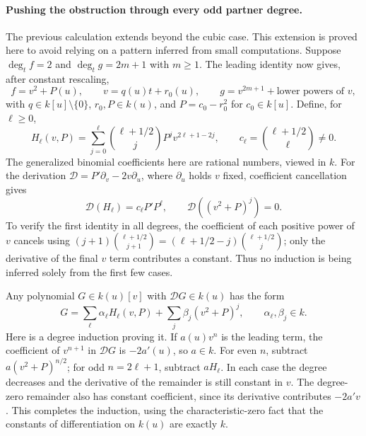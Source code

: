 \documentclass[11pt]{article}
\begin{document}
\paragraph{Pushing the obstruction through every odd partner degree.}
The previous calculation extends beyond the cubic case. This extension is
proved here to avoid relying on a pattern inferred from small computations.
Suppose $\deg_t f=2$ and $\deg_t g=2m+1$ with $m\ge1$. The leading identity
now gives, after constant rescaling,
\[
 f=v^2+P(u),\qquad v=q(u)t+r_0(u),\qquad
 g=v^{2m+1}+\text{lower powers of }v,
\]
with $q\in k[u]\setminus\{0\}$, $r_0,P\in k(u)$, and
$P=c_0-r_0^2$ for $c_0\in k[u]$. Define, for $\ell\ge0$,
\begin{equation}\label{statement:oddforms}
 H_\ell(v,P)=\sum_{j=0}^{\ell}
   \binom{\ell+1/2}{j}P^jv^{2\ell+1-2j},
 \qquad
 c_\ell=\binom{\ell+1/2}{\ell}\ne0.
\end{equation}
The generalized binomial coefficients here are rational numbers, viewed in
$k$. For the derivation
$\mathcal D=P'\partial_v-2v\partial_u$, where $\partial_u$ holds $v$ fixed,
coefficient cancellation gives
\begin{equation}\label{statement:derivation}
 \mathcal D(H_\ell)=c_\ell P'P^\ell,
 \qquad \mathcal D((v^2+P)^j)=0.
\end{equation}
To verify the first identity in all degrees, the coefficient of each positive
power of $v$ cancels using
$(j+1)\binom{\ell+1/2}{j+1}
 =(\ell+1/2-j)\binom{\ell+1/2}{j}$; only the derivative of the final
$v$ term contributes a constant. Thus no induction is being inferred solely
from the first few cases.

Any polynomial $G\in k(u)[v]$ with $\mathcal D G\in k(u)$ has the form
\begin{equation}\label{statement:classification}
 G=\sum_{\ell}\alpha_\ell H_\ell(v,P)
      +\sum_j\beta_j(v^2+P)^j,
 \qquad\alpha_\ell,\beta_j\in k.
\end{equation}
Here is a degree induction proving it. If $a(u)v^n$ is the leading term,
the coefficient of $v^{n+1}$ in $\mathcal DG$ is $-2a'(u)$, so $a\in k$.
For even $n$, subtract $a(v^2+P)^{n/2}$; for odd $n=2\ell+1$, subtract
$aH_\ell$. In each case the degree decreases and the derivative of the
remainder is still constant in $v$. The degree-zero remainder also has
constant coefficient, since its derivative contributes $-2a'v$.
This completes the induction, using the characteristic-zero fact that the
constants of differentiation on $k(u)$ are exactly $k$.
\end{document}

